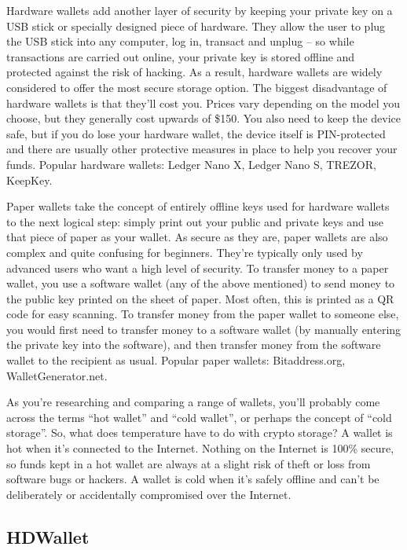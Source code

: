 Hardware wallets add another layer of security by keeping your private key on a USB stick or specially designed piece of hardware. They allow the user to plug the USB stick into any computer, log in, transact and unplug – so while transactions are carried out online, your private key is stored offline and protected against the risk of hacking. As a result, hardware wallets are widely considered to offer the most secure storage option. The biggest disadvantage of hardware wallets is that they’ll cost you. Prices vary depending on the model you choose, but they generally cost upwards of \$150. You also need to keep the device safe, but if you do lose your hardware wallet, the device itself is PIN-protected and there are usually other protective measures in place to help you recover your funds. Popular hardware wallets: Ledger Nano X, Ledger Nano S, TREZOR, KeepKey.

Paper wallets take the concept of entirely offline keys used for hardware wallets to the next logical step: simply print out your public and private keys and use that piece of paper as your wallet. As secure as they are, paper wallets are also complex and quite confusing for beginners. They’re typically only used by advanced users who want a high level of security. To transfer money to a paper wallet, you use a software wallet (any of the above mentioned) to send money to the public key printed on the sheet of paper. Most often, this is printed as a QR code for easy scanning. To transfer money from the paper wallet to someone else, you would first need to transfer money to a software wallet (by manually entering the private key into the software), and then transfer money from the software wallet to the recipient as usual. Popular paper wallets: Bitaddress.org, WalletGenerator.net.

As you’re researching and comparing a range of wallets, you’ll probably come across the terms “hot wallet” and “cold wallet”, or perhaps the concept of “cold storage”. So, what does temperature have to do with crypto storage?
A wallet is hot when it's connected to the Internet. Nothing on the Internet is 100\% secure, so funds kept in a hot wallet are always at a slight risk of theft or loss from software bugs or hackers. A wallet is cold when it's safely offline and can't be deliberately or accidentally compromised over the Internet.

\subsection{HDWallet}

